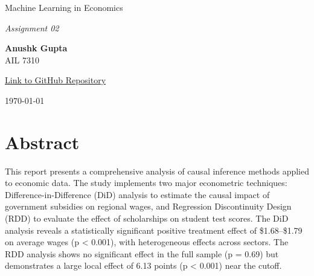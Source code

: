 \documentclass[a4paper,12pt,headsepline]{scrartcl} %
\begin{document}
\begin{titlepage}
    \centering
    \vspace*{2cm} %
    
    
    \vspace{1cm} %
    
    {\huge\color{IITJBlue} Machine Learning in Economics}
    
    \vspace{0.5cm}
    
    {\Large\itshape Assignment 02}
    
    \vfill %
    
    {\large\bfseries Anushk Gupta} \\
    {\mdseries AIL 7310}
    
    \vspace{0.8cm}
    
    {\large \href{https://github.com/introspective321/Sem_7_assignments}{\color{HyperlinkBlue}Link to GitHub Repository}}
    
    \vspace{1.5cm}
    
    {\large \today}
    
\end{titlepage}

\tableofcontents
\newpage

\section{Abstract}
This report presents a comprehensive analysis of causal inference methods applied to economic data. The study implements two major econometric techniques: Difference-in-Difference (DiD) analysis to estimate the causal impact of government subsidies on regional wages, and Regression Discontinuity Design (RDD) to evaluate the effect of scholarships on student test scores. The DiD analysis reveals a statistically significant positive treatment effect of \$1.68--\$1.79 on average wages (p < 0.001), with heterogeneous effects across sectors. The RDD analysis shows no significant effect in the full sample (p = 0.69) but demonstrates a large local effect of 6.13 points (p < 0.001) near the cutoff.
\end{document}
